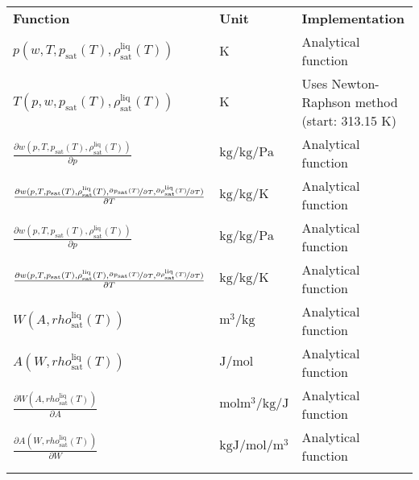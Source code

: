 \begin{longtable}[l]{l|l|p{4cm}}
	\toprule
	\addlinespace
	\textbf{Function} & \textbf{Unit} &	\textbf{Implementation} \\
	\addlinespace
	\midrule
	\endhead
	
	\bottomrule
	\endfoot
	\bottomrule
	\endlastfoot
	\addlinespace
	
	$p(w,T,p_\mathrm{sat}(T),\rho_\mathrm{sat}^\mathrm{liq}(T))$	& $\si{\kelvin}$ & Analytical function\\
	$T(p,w,p_\mathrm{sat}(T),\rho_\mathrm{sat}^\mathrm{liq}(T))$	& $\si{\kelvin}$ & Uses Newton-Raphson method (start: 313.15 K) \\
	$\frac{\partial w(p,T,p_\mathrm{sat}(T),\rho_\mathrm{sat}^\mathrm{liq}(T))}{\partial p}$	& $\si{\kilogram\per\kilogram\per\pascal}$ & Analytical function\\
	$\frac{\partial w(p,T,p_\mathrm{sat}(T),\rho_\mathrm{sat}^\mathrm{liq}(T),\nicefrac{\partial p_\mathrm{sat}(T)}{\partial T},\nicefrac{\partial \rho_\mathrm{sat}^\mathrm{liq}(T)}{\partial T})}{\partial T}$	& $\si{\kilogram\per\kilogram\per\kelvin}$ & Analytical function\\
	$\frac{\partial w(p,T,p_\mathrm{sat}(T),\rho_\mathrm{sat}^\mathrm{liq}(T))}{\partial p}$	& $\si{\kilogram\per\kilogram\per\pascal}$ & Analytical function\\
	$\frac{\partial w(p,T,p_\mathrm{sat}(T),\rho_\mathrm{sat}^\mathrm{liq}(T),\nicefrac{\partial p_\mathrm{sat}(T)}{\partial T},\nicefrac{\partial \rho_\mathrm{sat}^\mathrm{liq}(T)}{\partial T})}{\partial T}$	& $\si{\kilogram\per\kilogram\per\kelvin}$ & Analytical function\\
	$W(A,rho_\mathrm{sat}^\mathrm{liq}(T))$ & $\si{\cubic\meter\per\kilogram}$ & Analytical function \\
	$A(W,rho_\mathrm{sat}^\mathrm{liq}(T))$ & $\si{\joule\per\mole}$ & Analytical function \\
	$\frac{\partial W(A,rho_\mathrm{sat}^\mathrm{liq}(T))}{\partial A}$ & $\si{\mole\cubic\meter\per\kilogram\per\joule}$ & Analytical function \\
	$\frac{\partial A(W,rho_\mathrm{sat}^\mathrm{liq}(T))}{\partial W}$ & $\si{\kilogram\joule\per\mole\per\cubic\meter}$ & Analytical function \\
	
	\addlinespace
\end{longtable}
%
